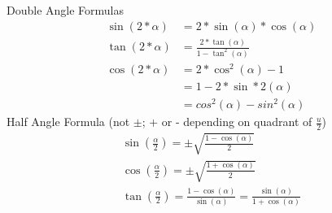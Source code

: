 \documentclass{article}
\renewcommand{\a}{\alpha}
\begin{document}
	Double Angle Formulas
	\begin{align*}
		\sin(2 * \a) &= 2 * \sin(\a) * \cos(\a) \\
		\tan(2 * \a) &= \frac{ 2 * \tan(\a)}{1 - \tan^2(\a)} \\
		\cos(2 * \a) &= 2 * \cos^2(\a) - 1 \\
		&= 1 - 2 * \sin*2(\a) \\
		&= cos^2(\a) - sin^2(\a)
	\end{align*}
	Half Angle Formula (not $\pm$; + or - depending on quadrant of $\frac{u}{2}$)
	\begin{align*}
		\sin(\frac{\a}{2}) = \pm \sqrt{ \frac{1 - \cos(\a)}{2} } \\
		\cos(\frac{\a}{2}) = \pm \sqrt{ \frac{1 + \cos(\a)}{2} } \\
		\tan(\frac{\a}{2}) = \frac{1 - \cos(\a)}{\sin(\a)} = \frac{\sin(\a)}{1 + \cos(\a)}
	\end{align*}
\end{document}
